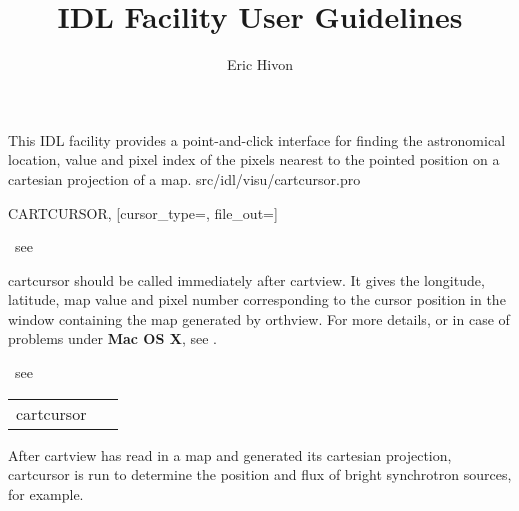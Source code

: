 




\sloppy



\title{\healpix IDL Facility User Guidelines}
 \section[cartcursor]{ }
\label{idl:\thedocid}
\author{Eric Hivon}


\begin{facility}
{This IDL facility provides a point-and-click interface for finding
the astronomical location, value and pixel index of the pixels nearest 
to the pointed position on a cartesian projection of a \healpix map.}
{src/idl/visu/cartcursor.pro}
\end{facility}

\begin{IDLformat}
{CARTCURSOR, [cursor\_type=, file\_out=]}
\end{IDLformat}

\begin{qualifiers}
\hbox{\hspace{5cm}		see }
\end{qualifiers}

\begin{codedescription}
{cartcursor should be called immediately after cartview. It gives the longitude,
latitude, map value and pixel number
corresponding to the cursor position in the window containing the map generated
by orthview. For more details, or in case
of problems under {\bf Mac OS X}, see .}
\end{codedescription}



\begin{related}
\hbox{\hspace{5cm}	see }
\end{related}


\begin{example}
{
\begin{tabular}{ll} %
cartcursor & \ 
\end{tabular}
}
{After cartview has read in a map and generated
its cartesian projection, cartcursor is run to determine the
position and flux of bright synchrotron sources, for example.}
\end{example}


